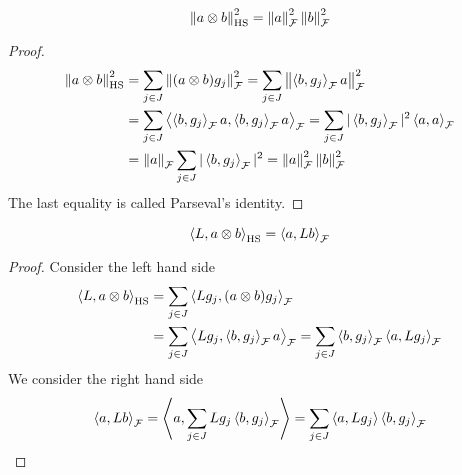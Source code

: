 \begin{lemma}
    \begin{equation*}
        \left\lVert a\otimes b\right\rVert_{\operatorname{HS}}^2 = \left\lVert a\right\rVert^2_\mathcal{F}\left\lVert b\right\rVert^2_\mathcal{F}
    \end{equation*}
\end{lemma}
\begin{proof}
    \begin{equation*}
    \begin{aligned}
        \left\lVert a\otimes b\right\rVert_{\operatorname{HS}}^2 &= \sum_{j\in J}\left\lVert(a\otimes b)g_j\right\rVert^2_\mathcal{F} = \sum_{j\in J} \left\lVert\left\langle b,g_j \right\rangle_\mathcal{F}a\right\rVert_\mathcal{F}^2 \\
        &= \sum_{j\in J}\left\langle \left\langle b,g_j \right\rangle_\mathcal{F}a, \left\langle b,g_j \right\rangle_\mathcal{F}a \right\rangle_\mathcal{F}  
        = \sum_{j\in J} |\left\langle b,g_j \right\rangle_\mathcal{F}|^2\left\langle a, a \right\rangle_\mathcal{F} \\
        &= \left\lVert a\right\rVert_\mathcal{F} \sum_{j\in J} |\left\langle b,g_j \right\rangle_\mathcal{F}|^2 = \left\lVert a\right\rVert^2_\mathcal{F}\left\lVert b\right\rVert^2_\mathcal{F}
    \end{aligned}
    \end{equation*}
    The last equality is called Parseval's identity.
\end{proof}
\begin{lemma}
    \begin{equation*}
        \left\langle L, a\otimes b \right\rangle_{\operatorname{HS}} = \left\langle a, Lb \right\rangle_\mathcal{F}
    \end{equation*}
\end{lemma}
\begin{proof}
    Consider the left hand side
    \begin{equation*}
    \begin{aligned}
        \left\langle L, a\otimes b \right\rangle_{\operatorname{HS}} &= \sum_{j\in J} \left\langle Lg_j, (a\otimes b)g_j \right\rangle_\mathcal{F} \\
        &= \sum_{j\in J} \left\langle  Lg_j, \left\langle b, g_j \right\rangle_\mathcal{F}a  \right\rangle_\mathcal{F} = \sum_{j\in J}\left\langle b, g_j \right\rangle_\mathcal{F} \left\langle  a, Lg_j  \right\rangle_\mathcal{F}
    \end{aligned}
    \end{equation*}
    We consider the right hand side 
    \begin{equation*}
        \left\langle a, Lb \right\rangle_\mathcal{F} = \left\langle a, \sum_{j\in J}Lg_j\left\langle b, g_j \right\rangle_\mathcal{F} \right\rangle = \sum_{j\in J}\left\langle a, Lg_j \right\rangle\left\langle b, g_j \right\rangle_\mathcal{F}
    \end{equation*}
\end{proof}

